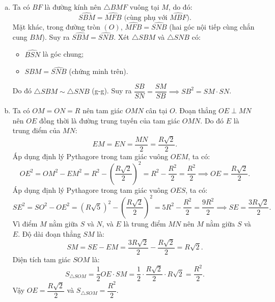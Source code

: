 \begin{bt}
{\begin{enumerate}[a)]
	Tứ giác $SAOB$ có $\widehat{SAO} + \widehat{SBO} = 90^\circ + 90^\circ = 180^\circ$, suy ra tứ giác $SAOB$ nội tiếp đường tròn đường kính $SO$.
	\item Ta có $BF$ là đường kính nên $\triangle BMF$ vuông tại $M$, do đó:
	$$\widehat{SBM} = \widehat{MFB} \text{ (cùng phụ với } \widehat{MBF}\text{)}.$$
	Mặt khác, trong đường tròn $(O)$, $\widehat{MFB} = \widehat{SNB}$ (hai góc nội tiếp cùng chắn cung $BM$).
	Suy ra $\widehat{SBM} = \widehat{SNB}$.
	Xét $\triangle SBM$ và $\triangle SNB$ có:
	\begin{itemize}
		\item $\widehat{BSN}$ là góc chung;
		\item $\widehat{SBM} = \widehat{SNB}$ (chứng minh trên).
	\end{itemize}
	Do đó $\triangle SBM \sim \triangle SNB$ (g-g).
	Suy ra $\dfrac{SB}{SN} = \dfrac{SM}{SB} \implies SB^2 = SM \cdot SN$.
	\item Ta có $OM = ON = R$ nên tam giác $OMN$ cân tại $O$.
	Đoạn thẳng $OE \perp MN$ nên $OE$ đồng thời là đường trung tuyến của tam giác $OMN$.
	Do đó $E$ là trung điểm của $MN$:
	$$EM = EN = \dfrac{MN}{2} = \dfrac{R\sqrt{2}}{2}.$$
	Áp dụng định lý Pythagore trong tam giác vuông $OEM$, ta có:
	$$OE^2 = OM^2 - EM^2 = R^2 - \left(\dfrac{R\sqrt{2}}{2}\right)^2 = R^2 - \dfrac{R^2}{2} = \dfrac{R^2}{2} \implies OE = \dfrac{R\sqrt{2}}{2}.$$
	Áp dụng định lý Pythagore trong tam giác vuông $OES$, ta có:
	$$SE^2 = SO^2 - OE^2 = (R\sqrt{5})^2 - \left(\dfrac{R\sqrt{2}}{2}\right)^2 = 5R^2 - \dfrac{R^2}{2} = \dfrac{9R^2}{2} \implies SE = \dfrac{3R\sqrt{2}}{2}.$$
	Vì điểm $M$ nằm giữa $S$ và $N$, và $E$ là trung điểm $MN$ nên $M$ nằm giữa $S$ và $E$.
	Độ dài đoạn thẳng $SM$ là:
	$$SM = SE - EM = \dfrac{3R\sqrt{2}}{2} - \dfrac{R\sqrt{2}}{2} = R\sqrt{2}.$$
	Diện tích tam giác $SOM$ là:
	$$S_{\triangle SOM} = \dfrac{1}{2} OE \cdot SM = \dfrac{1}{2} \cdot \dfrac{R\sqrt{2}}{2} \cdot R\sqrt{2} = \dfrac{R^2}{2}.$$
	Vậy $OE = \dfrac{R\sqrt{2}}{2}$ và $S_{\triangle SOM} = \dfrac{R^2}{2}$.
\end{enumerate}
}
\end{bt}


